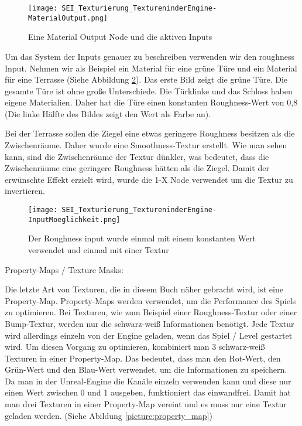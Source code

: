 \begin{figure}[H]
    \centering
    \texttt{[image: SEI\_Texturierung\_TextureninderEngine-MaterialOutput.png]}
    \caption{Eine Material Output Node und die aktiven Inputs}
    \label{picture:mat_ue4_node}
\end{figure}


Um das System der Inputs genauer zu beschreiben verwenden wir den roughness Input. Nehmen wir als Beispiel ein Material
für eine grüne Türe und ein Material für eine Terrasse (Siehe Abbildung \ref{picture:tex_mat_roughness}).
Das erste Bild zeigt die grüne Türe. Die gesamte Türe ist ohne große Unterschiede. Die Türklinke und das Schloss haben
eigene Materialien. Daher hat die Türe einen konstanten Roughness-Wert von 0,8 (Die linke Hälfte des Bildes zeigt
den Wert als Farbe an).

Bei der Terrasse sollen die Ziegel eine etwas geringere Roughness besitzen als die Zwischenräume. Daher wurde eine
Smoothness-Textur erstellt. Wie man sehen kann, sind die Zwischenräume der Textur dünkler, was bedeutet, dass die
Zwischenräume eine geringere Roughness hätten als die Ziegel. Damit der erwünschte Effekt erzielt wird, wurde die
1-X Node verwendet um die Textur zu invertieren.

\begin{figure}[H]
    \centering
    \texttt{[image: SEI\_Texturierung\_TextureninderEngine-InputMoeglichkeit.png]}
    \caption{Der Roughness input wurde einmal mit einem konstanten Wert verwendet und einmal mit einer Textur}
    \label{picture:tex_mat_roughness}
\end{figure}


Property-Maps / Texture Masks\citep{ue:tex_property_map}:

Die letzte Art von Texturen, die in diesem Buch näher gebracht wird, ist eine Property-Map. Property-Maps werden
verwendet, um die Performance des Spiels zu optimieren. Bei Texturen, wie zum Beispiel einer Roughness-Textur oder einer
Bump-Textur, werden nur die schwarz-weiß Informationen benötigt. Jede Textur wird allerdings einzeln von der Engine
geladen, wenn das Spiel / Level gestartet wird. Um diesen Vorgang zu optimieren, kombiniert man 3 schwarz-weiß Texturen
in einer Property-Map. Das bedeutet, dass man den Rot-Wert, den Grün-Wert und den Blau-Wert verwendet, um die
Informationen zu speichern. Da man in der Unreal-Engine die Kanäle einzeln verwenden kann und diese nur einen Wert
zwischen 0 und 1 ausgeben, funktioniert das einwandfrei. Damit hat man drei Texturen in einer
Property-Map vereint und es muss nur eine Textur geladen werden. (Siehe Abildung \ref{picture:property_map})

